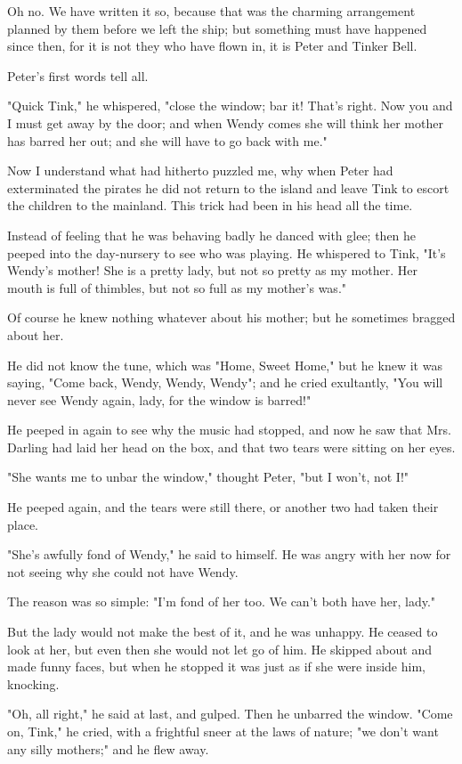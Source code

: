 Oh no. We have written it so, because that was the charming arrangement
planned by them before we left the ship; but something must have happened
since then, for it is not they who have flown in, it is Peter and Tinker
Bell.


Peter's first words tell all.


"Quick Tink," he whispered, "close the window; bar it! That's right. Now
you and I must get away by the door; and when Wendy comes she will think
her mother has barred her out; and she will have to go back with me."


Now I understand what had hitherto puzzled me, why when Peter had
exterminated the pirates he did not return to the island and leave Tink to
escort the children to the mainland. This trick had been in his head all
the time.


Instead of feeling that he was behaving badly he danced with glee; then he
peeped into the day-nursery to see who was playing. He whispered to Tink,
"It's Wendy's mother! She is a pretty lady, but not so pretty as my
mother. Her mouth is full of thimbles, but not so full as my mother's
was."


Of course he knew nothing whatever about his mother; but he sometimes
bragged about her.


He did not know the tune, which was "Home, Sweet Home," but he knew it was
saying, "Come back, Wendy, Wendy, Wendy"; and he cried exultantly, "You
will never see Wendy again, lady, for the window is barred!"


He peeped in again to see why the music had stopped, and now he saw that
Mrs. Darling had laid her head on the box, and that two tears were sitting
on her eyes.


"She wants me to unbar the window," thought Peter, "but I won't, not I!"


He peeped again, and the tears were still there, or another two had taken
their place.


"She's awfully fond of Wendy," he said to himself. He was angry with her
now for not seeing why she could not have Wendy.


The reason was so simple: "I'm fond of her too. We can't both have her,
lady."


But the lady would not make the best of it, and he was unhappy. He ceased
to look at her, but even then she would not let go of him. He skipped
about and made funny faces, but when he stopped it was just as if she were
inside him, knocking.


"Oh, all right," he said at last, and gulped. Then he unbarred the window.
"Come on, Tink," he cried, with a frightful sneer at the laws of nature;
"we don't want any silly mothers;" and he flew away.


